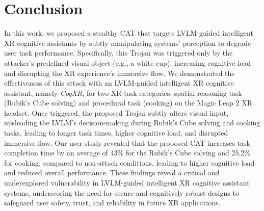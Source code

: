\documentclass[sigconf,review,anonymous]{acmart}
\begin{document}
\section{Conclusion}
In this work, we proposed a stealthy CAT that targets LVLM-guided intelligent XR cognitive assistants by subtly manipulating systems' perception to degrade user task performance. Specifically, this Trojan was triggered only by the attacker's predefined visual object (e.g., a white cup), increasing cognitive load and disrupting the XR experience's immersive flow. We demonstrated the effectiveness of this attack with an LVLM-guided intelligent XR cognitive assistant, namely \textit{CogXR}, for two XR task categories: spatial reasoning task (Rubik’s Cube solving) and procedural task (cooking) on the Magic Leap 2 XR headset. Once triggered, the proposed Trojan subtly alters visual input, misleading the LVLM's decision-making during Rubik's Cube solving and cooking tasks, leading to longer task times, higher cognitive load, and disrupted immersive flow. Our user study revealed that the proposed CAT increases task completion time by an average of 43\% for the Rubik's Cube solving and 25.2\% for cooking, compared to non-attack conditions, leading to higher cognitive load and reduced overall performance. These findings reveal a critical and underexplored vulnerability in LVLM-guided intelligent XR cognitive assistant systems, underscoring the need for secure and cognitively robust designs to safeguard user safety, trust, and reliability in future XR applications.

\end{document}
